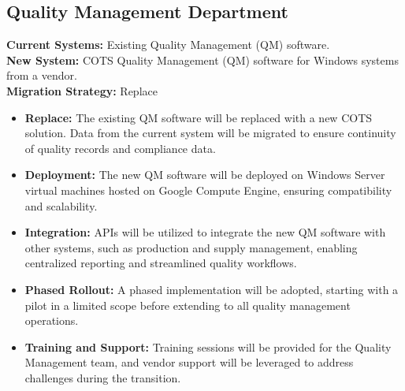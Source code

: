 \subsection{Quality Management Department}
\textbf{Current Systems:} Existing Quality Management (QM) software. \\
\textbf{New System:} COTS Quality Management (QM) software for Windows systems from a vendor. \\
\textbf{Migration Strategy:} Replace
\begin{itemize}
    \item \textbf{Replace:} The existing QM software will be replaced with a new COTS solution. Data from the current system will be migrated to ensure continuity of quality records and compliance data.
    \item \textbf{Deployment:} The new QM software will be deployed on Windows Server virtual machines hosted on Google Compute Engine, ensuring compatibility and scalability.
    \item \textbf{Integration:} APIs will be utilized to integrate the new QM software with other systems, such as production and supply management, enabling centralized reporting and streamlined quality workflows.
    \item \textbf{Phased Rollout:} A phased implementation will be adopted, starting with a pilot in a limited scope before extending to all quality management operations.
    \item \textbf{Training and Support:} Training sessions will be provided for the Quality Management team, and vendor support will be leveraged to address challenges during the transition.
\end{itemize}


